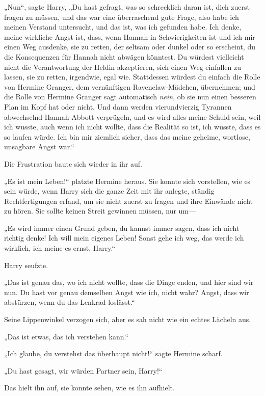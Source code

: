 {„Nun“, sagte Harry, „Du hast gefragt, was so schrecklich daran ist, dich zuerst fragen zu müssen, und das war eine überraschend gute Frage, also habe ich meinen Verstand untersucht, und das ist, was ich gefunden habe. Ich denke, meine wirkliche Angst ist, dass, wenn Hannah in Schwierigkeiten ist und ich mir einen Weg ausdenke, sie zu retten, der seltsam oder dunkel oder so erscheint, du die Konsequenzen für Hannah nicht abwägen könntest. Du würdest vielleicht nicht die Verantwortung der Heldin akzeptieren, sich einen Weg einfallen zu lassen, sie zu retten, irgendwie, egal wie. Stattdessen würdest du einfach die Rolle von Hermine Granger, dem vernünftigen Ravenclaw-Mädchen, übernehmen; und die Rolle von Hermine Granger sagt automatisch \emph{nein}, ob sie nun einen besseren Plan im Kopf hat oder nicht. Und dann werden vierundvierzig Tyrannen abwechselnd Hannah Abbott verprügeln, und es wird alles meine Schuld sein, weil ich wusste, auch wenn ich nicht wollte, dass die Realität so ist, ich wusste, dass es so laufen würde. Ich bin mir ziemlich sicher, dass das meine geheime, wortlose, unsagbare Angst war.“

Die Frustration baute sich wieder in ihr auf.

„Es ist mein Leben!“ platzte Hermine heraus. Sie konnte sich vorstellen, wie es sein würde, wenn Harry sich die ganze Zeit mit ihr anlegte, ständig Rechtfertigungen erfand, um sie nicht zuerst zu fragen und ihre Einwände nicht zu hören. Sie sollte keinen Streit gewinnen müssen, nur um—

„Es wird immer einen Grund geben, du kannst immer sagen, dass ich nicht richtig denke! Ich will mein eigenes Leben! Sonst gehe ich weg, das werde ich wirklich, ich meine es ernst, Harry.“

Harry seufzte.

„Das ist genau das, wo ich nicht wollte, dass die Dinge enden, und hier sind wir nun. Du hast vor genau demselben Angst wie ich, nicht wahr? Angst, dass wir abstürzen, wenn du das Lenkrad loslässt.“

Seine Lippenwinkel verzogen sich, aber es sah nicht wie ein echtes Lächeln aus.

„Das ist etwas, das ich verstehen kann.“

„Ich glaube, du verstehst das überhaupt nicht!“ sagte Hermine scharf.

„Du hast gesagt, wir würden Partner sein, Harry!“

Das hielt ihn auf, sie konnte sehen, wie es ihn aufhielt.

}
